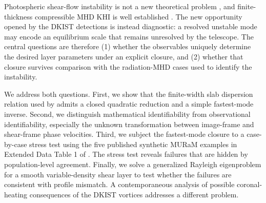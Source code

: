 \documentclass[linenumbers]{aastex7}
\begin{document}
Photospheric shear-flow instability is not a new theoretical problem \citep{Karpen1993,Kolesnikov2004}, and finite-thickness compressible MHD KHI is well established \citep{MiuraPritchett1982}. The new opportunity opened by the DKIST detections is instead diagnostic: a resolved unstable mode may encode an equilibrium scale that remains unresolved by the telescope. The central questions are therefore (1) whether the observables uniquely determine the desired layer parameters under an explicit closure, and (2) whether that closure survives comparison with the radiation-MHD cases used to identify the instability.

We address both questions. First, we show that the finite-width slab dispersion relation used by \citet{Kuridze2026} admits a closed quadratic reduction and a simple fastest-mode inverse. Second, we distinguish mathematical identifiability from observational identifiability, especially the unknown transformation between image-frame and shear-frame phase velocities. Third, we subject the fastest-mode closure to a case-by-case stress test using the five published synthetic MURaM examples in Extended Data Table 1 of \citet{Kuridze2026}. The stress test reveals failures that are hidden by population-level agreement. Finally, we solve a generalized Rayleigh eigenproblem for a smooth variable-density shear layer to test whether the failures are consistent with profile mismatch. A contemporaneous analysis of possible coronal-heating consequences of the DKIST vortices \citep{Nykyri2026} addresses a different problem.
\end{document}
